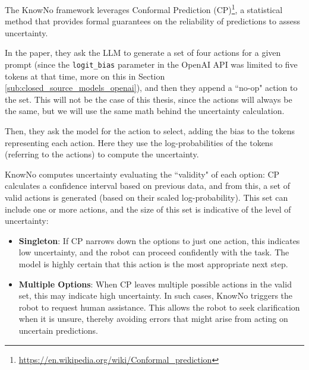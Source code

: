 The KnowNo framework leverages Conformal Prediction (CP)\footnote{\url{https://en.wikipedia.org/wiki/Conformal_prediction}},
a statistical method that provides formal guarantees on the reliability of
predictions to assess uncertainty.

In the paper, they ask the LLM to generate a set of four actions for a given prompt
(since the \texttt{logit\_bias} parameter in the OpenAI API was limited to five tokens
at that time, more on this in Section \ref{sub:closed_source_models_openai}),
and then they append a ``no-op" action to the set. This will not be the case of
this thesis, since the actions will always be the same, but we will use the same
math behind the uncertainty calculation.

Then, they ask the model for the action to select, adding the bias to the tokens
representing each action. Here they use the log-probabilities of the tokens (referring
to the actions) to compute the uncertainty.

KnowNo computes uncertainty evaluating the ``validity" of each option: CP calculates
a confidence interval based on previous data, and from this, a set of valid actions
is generated (based on their scaled log-probability). This set can include one
or more actions, and the size of this set is indicative of the level of uncertainty:
\begin{itemize}
  \item \textbf{Singleton}: If CP narrows down the options to just one action,
    this indicates low uncertainty, and the robot can proceed confidently with the
    task. The model is highly certain that this action is the most appropriate
    next step.

  \item \textbf{Multiple Options}: When CP leaves multiple possible actions in the
    valid set, this may indicate high uncertainty. In such cases, KnowNo
    triggers the robot to request human assistance. This allows the robot to seek
    clarification when it is unsure, thereby avoiding errors that might arise
    from acting on uncertain predictions.
\end{itemize}

